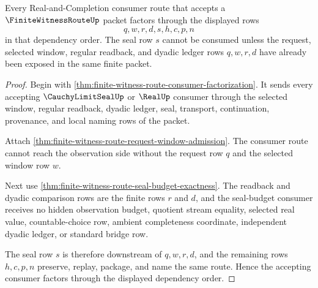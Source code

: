 \begin{theorem}
\label{thm:finite-witness-route-consumer-route-exactness}
Every Real-and-Completion consumer route that accepts a $\FiniteWitnessRouteUp$ packet factors through the displayed rows
$$
q,w,r,d,s,h,c,p,n
$$
in that dependency order. The seal row $s$ cannot be consumed unless the request, selected window, regular readback, and dyadic ledger rows $q,w,r,d$ have already been exposed in the same finite packet.
\end{theorem}
\begin{proof}
Begin with \autoref{thm:finite-witness-route-consumer-factorization}. It sends every accepting $\CauchyLimitSealUp$ or $\RealUp$ consumer through the selected window, regular readback, dyadic ledger, seal, transport, continuation, provenance, and local naming rows of the packet.

Attach \autoref{thm:finite-witness-route-request-window-admission}. The consumer route cannot reach the observation side without the request row $q$ and the selected window row $w$.

Next use \autoref{thm:finite-witness-route-seal-budget-exactness}. The readback and dyadic comparison rows are the finite rows $r$ and $d$, and the seal-budget consumer receives no hidden observation budget, quotient stream equality, selected real value, countable-choice row, ambient completeness coordinate, independent dyadic ledger, or standard bridge row.

The seal row $s$ is therefore downstream of $q,w,r,d$, and the remaining rows $h,c,p,n$ preserve, replay, package, and name the same route. Hence the accepting consumer factors through the displayed dependency order.
\end{proof}

